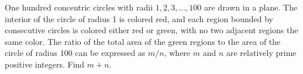 One hundred concentric circles with radii $1, 2, 3, \dots, 100$ are drawn in a plane.  The interior of the circle of radius 1 is colored red, and each region bounded by consecutive circles is colored either red or green, with no two adjacent regions the same color.  The ratio of the total area of the green regions to the area of the circle of radius 100 can be expressed as $m/n$, where $m$ and $n$ are relatively prime positive integers.  Find $m + n$.